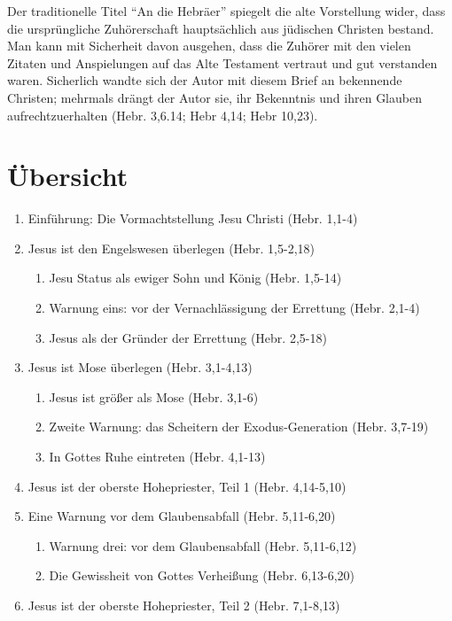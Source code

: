 \documentclass[
  12pt,
]{krantz}
\providecommand{\tightlist}{%
  \setlength{\itemsep}{0pt}\setlength{\parskip}{0pt}}
\begin{document}
Der traditionelle Titel ``An die Hebräer'' spiegelt die alte Vorstellung wider, dass die ursprüngliche Zuhörerschaft hauptsächlich aus jüdischen Christen bestand. Man kann mit Sicherheit davon ausgehen, dass die Zuhörer mit den vielen Zitaten und Anspielungen auf das Alte Testament vertraut und gut verstanden waren. Sicherlich wandte sich der Autor mit diesem Brief an bekennende Christen; mehrmals drängt der Autor sie, ihr Bekenntnis und ihren Glauben aufrechtzuerhalten (Hebr. 3,6.14; Hebr 4,14; Hebr 10,23).

\hypertarget{uxfcbersicht}{%
\section{Übersicht}\label{uxfcbersicht}}

\begin{enumerate}
\def\labelenumi{\arabic{enumi}.}
\tightlist
\item
  Einführung: Die Vormachtstellung Jesu Christi (Hebr. 1,1-4)
\item
  Jesus ist den Engelswesen überlegen (Hebr. 1,5-2,18)

  \begin{enumerate}
  \def\labelenumii{\roman{enumii}.}
  \tightlist
  \item
    Jesu Status als ewiger Sohn und König (Hebr. 1,5-14)
  \item
    Warnung eins: vor der Vernachlässigung der Errettung (Hebr. 2,1-4)
  \item
    Jesus als der Gründer der Errettung (Hebr. 2,5-18)
  \end{enumerate}
\item
  Jesus ist Mose überlegen (Hebr. 3,1-4,13)

  \begin{enumerate}
  \def\labelenumii{\roman{enumii}.}
  \tightlist
  \item
    Jesus ist größer als Mose (Hebr. 3,1-6)
  \item
    Zweite Warnung: das Scheitern der Exodus-Generation (Hebr. 3,7-19)
  \item
    In Gottes Ruhe eintreten (Hebr. 4,1-13)
  \end{enumerate}
\item
  Jesus ist der oberste Hohepriester, Teil 1 (Hebr. 4,14-5,10)
\item
  Eine Warnung vor dem Glaubensabfall (Hebr. 5,11-6,20)

  \begin{enumerate}
  \def\labelenumii{\roman{enumii}.}
  \tightlist
  \item
    Warnung drei: vor dem Glaubensabfall (Hebr. 5,11-6,12)
  \item
    Die Gewissheit von Gottes Verheißung (Hebr. 6,13-6,20)
  \end{enumerate}
\item
  Jesus ist der oberste Hohepriester, Teil 2 (Hebr. 7,1-8,13)


\end{enumerate}
\end{document}
